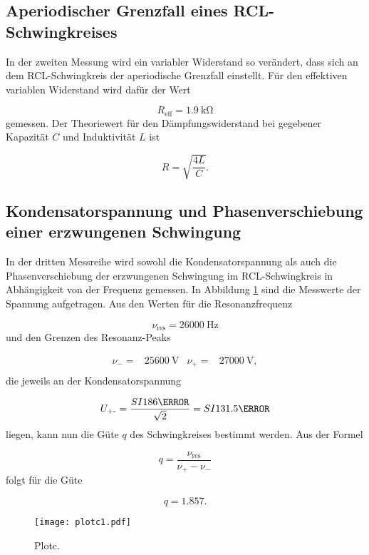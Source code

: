 \subsection{Aperiodischer Grenzfall eines RCL-Schwingkreises}

In der zweiten Messung wird ein variabler Widerstand so verändert, dass
sich an dem RCL-Schwingkreis der aperiodische Grenzfall einstellt.
Für den effektiven variablen Widerstand wird dafür der Wert

\begin{equation}
  R_\text{eff} = \SI{1.9}{\kilo\ohm}
\end{equation}
gemessen.
Der Theoriewert für den Dämpfungswiderstand bei gegebener Kapazität $C$ und
Induktivität $L$ ist

\begin{equation}
  R = \sqrt{\frac{4L}{C}}.
\end{equation}


\subsection{Kondensatorspannung und Phasenverschiebung
einer erzwungenen Schwingung}

In der dritten Messreihe wird sowohl die Kondensatorspannung als auch die
Phasenverschiebung der erzwungenen Schwingung im RCL-Schwingkreis in
Abhängigkeit von der Frequenz gemessen. In Abbildung \ref{fig:plotc1} sind
die Messwerte der Spannung aufgetragen. Aus den Werten für die
Resonanzfrequenz

\begin{equation}
  \nu_\text{res} = \SI{26000}{\hertz}
\end{equation}
und den Grenzen des Resonanz-Peaks

\begin{align}
  \nu_- = & \SI{25600}{\V} & \nu_+ = & \SI{27000}{\V}, \\
\end{align}
die jeweils an der Kondensatorspannung

\begin{equation}
  U_\text{+-} = \frac{SI{186}{\V}}{\sqrt{2}} = SI{131.5}{\V}
\end{equation}
liegen, kann nun die Güte $q$ des Schwingkreises bestimmt werden.
Aus der Formel

\begin{equation}
  q = \frac{\nu_\text{res}}{\nu_+ - \nu_-}
\end{equation}
folgt für die Güte

\begin{equation}
  q = 1.857 .
\end{equation}




\begin{figure}[h]
  \centering
  \texttt{[image: plotc1.pdf]}
  \caption{Plotc.}
  \label{fig:plotc1}
\end{figure}
